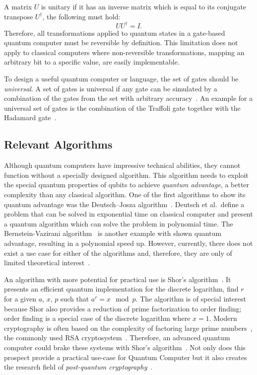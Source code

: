 A matrix $U$ is unitary if it has an inverse matrix which is equal to its conjugate transpose $U^\dagger$, \ie the following must hold:
\begin{equation*}
    U U^\dagger = I.
\end{equation*}
Therefore, all transformations applied to quantum states in a gate-based quantum computer must be reversible by definition. This limitation does not apply to classical computers where non-reversible transformations, \eg mapping an arbitrary bit to a specific value, are easily implementable. 

To design a useful quantum computer or language, the set of gates should be \emph{universal}. A set of gates is universal if any gate can be simulated by a combination of the gates from the set with arbitrary accuracy~\cite{BrBr01}. An example for a universal set of gates is the combination of the Traffoli gate together with the Hadamard gate~\cite{DiCh20}.

\subsection{Relevant Algorithms}
\label{sec:background_algorithms}
Although quantum computers have impressive technical abilities, they cannot function without a specially designed algorithm. This algorithm needs to exploit the special quantum properties of qubits to achieve \emph{quantum advantage}, \ie a better complexity than any classical algorithm. One of the first algorithms to show its quantum advantage was the Deutsch–Josza algorithm~\cite{DeJo92}. Deutsch et al.\ define a problem that can be solved in exponential time on classical computer and present a quantum algorithm which can solve the problem in polynomial time. The Bernstein-Vazirani algorithm~\cite{BeVa93} is another example with shown quantum advantage, resulting in a polynomial speed up. However, currently, there does not exist a use case for either of the algorithms and, therefore, they are only of limited theoretical interest~\cite{DiCh20}.  

An algorithm with more potential for practical use is Shor's algorithm~\cite{Shor97}. It presents an efficient quantum implementation for the discrete logarithm, \ie find $r$ for a given $a$, $x$, $p$ such that $a^r = x \mod p$. The algorithm is of special interest because Shor also provides a reduction of prime factorization to order finding; order finding is a special case of the discrete logarithm where $x = 1$. Modern cryptography is often based on the complexity of factoring large prime numbers~, \eg the commonly used RSA cryptosystem~\cite{RSA78}. Therefore, an advanced quantum computer could brake these systems with Shor's algorithm~\cite{MVZJ18}. Not only does this prospect provide a practical use-case for Quantum Computer but it also creates the research field of \emph{post-quantum cryptography}~\cite{BeLa17}.  

